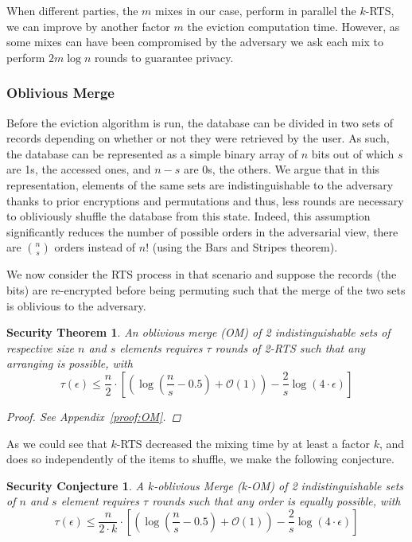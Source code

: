 \documentclass[USenglish,oneside,twocolumn]{article}
\newtheorem{secthm}{Security Theorem}
\newtheorem{seccjt}{Security Conjecture}
\begin{document}
When different parties, the $m$ mixes in our case, perform in parallel the $k$-RTS, we can improve by another factor $m$ the eviction computation time. However, as some mixes can have been compromised by the adversary we ask each mix to perform $2 m\log n$ rounds to guarantee privacy.
%
\subsubsection{Oblivious Merge}\label{OM}
Before the eviction algorithm is run, the database can be divided in two sets of records depending on whether or not they were retrieved by the user. As such, the database can be represented as a simple binary array of $n$ bits out of which $s$ are 1s, the accessed ones, and $n-s$ are 0s, the others.
We argue that in this representation, elements of the same sets are indistinguishable to the adversary thanks to prior encryptions and permutations and thus, less rounds are necessary to obliviously shuffle the database from this state. Indeed, this assumption significantly reduces the number of possible orders in the adversarial view, there are  ${n \choose s}$ orders instead of $n!$ (using the Bars and Stripes theorem).

We now consider the RTS process in that scenario and suppose the records (the bits) are re-encrypted before being permuting such that the merge of the two sets is oblivious to the adversary.

\begin{secthm}
An oblivious merge (OM) of 2 indistinguishable sets of respective size $n$ and $s$ elements requires $\tau$ rounds of 2-RTS such that any arranging is possible, with
$$\tau(\epsilon) \leq \frac{n}{2}  \cdot \left [ \left( \log \left (\frac{n}{s}-0.5\right) +\mathcal{O}\left(1\right) \right ) - \frac{2}{s} \log \left( 4 \cdot \epsilon\right) \right ] $$%
\begin{proof}
See Appendix~\ref{proof:OM}.
\end{proof}
\end{secthm}

As we could see that $k$-RTS decreased the mixing time by at least a factor $k$, and does so independently of the items to shuffle, we make the following conjecture.

\begin{seccjt}\label{sec:kOM}
A $k$-oblivious Merge ($k$-OM) of 2 indistinguishable sets of $n$ and $s$ element requires $\tau$ rounds such that any order is equally possible, with
$$ \tau(\epsilon) \leq \frac{n}{2\cdot k}  \cdot \left [ \left( \log \left (\frac{n}{s}-0.5\right) +\mathcal{O}\left(1\right) \right ) - \frac{2}{s} \log \left( 4 \cdot \epsilon\right) \right ] $$
\end{seccjt}
%
\end{document}
